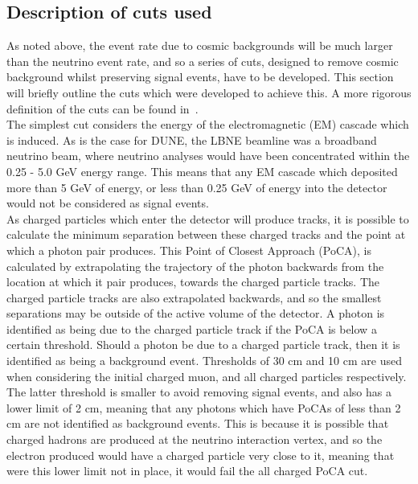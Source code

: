 \subsection{Description of cuts used} \label{sec:SurfCutList}
As noted above, the event rate due to cosmic backgrounds will be much larger than the neutrino event rate, and so a series of cuts, designed to remove cosmic background whilst preserving signal events, have to be developed. This section will briefly outline the cuts which were developed to achieve this. A more rigorous definition of the cuts can be found in~\citep{MartinsThesis}. \\

The simplest cut considers the energy of the electromagnetic (EM) cascade which is induced. As is the case for DUNE, the LBNE beamline was a broadband neutrino beam, where neutrino analyses would have been concentrated within the 0.25 - 5.0 GeV energy range. This means that any EM cascade which deposited more than 5 GeV of energy, or less than 0.25 GeV of energy into the detector would not be considered as signal events. \\

As charged particles which enter the detector will produce tracks, it is possible to calculate the minimum separation between these charged tracks and the point at which a photon pair produces. This Point of Closest Approach (PoCA), is calculated by extrapolating the trajectory of the photon backwards from the location at which it pair produces, towards the charged particle tracks. The charged particle tracks are also extrapolated backwards, and so the smallest separations may be outside of the active volume of the detector. A photon is identified as being due to the charged particle track if the PoCA is below a certain threshold. Should a photon be due to a charged particle track, then it is identified as being a background event. Thresholds of 30 cm and 10 cm are used when considering the initial charged muon, and all charged particles respectively. The latter threshold is smaller to avoid removing signal events, and also has a lower limit of 2 cm, meaning that any photons which have PoCAs of less than 2 cm are not identified as background events. This is because it is possible that charged hadrons are produced at the neutrino interaction vertex, and so the electron produced would have a charged particle very close to it, meaning that were this lower limit not in place, it would fail the all charged PoCA cut. \\ 

